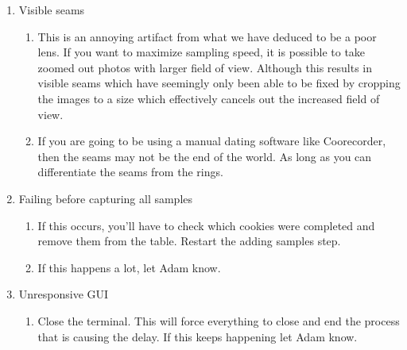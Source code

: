 \documentclass{article}
\begin{document}
\begin{outline}[enumerate]
\begin{enumerate}
\begin{enumerate}
        \end{enumerate}
    \item Visible seams
        \begin{enumerate}
        \item This is an annoying artifact from what we have deduced to be a poor lens. If you want to maximize sampling speed, it is possible to take zoomed out photos with larger field of view. Although this 
        results in visible seams which have seemingly only been able to be fixed by cropping the images to a size which effectively cancels out the increased field of view.
        \item If you are going to be using a manual dating software like Coorecorder, then the seams may not be the end of the world. As long as you can differentiate the seams from the rings.
        \end{enumerate}
    \item Failing before capturing all samples
        \begin{enumerate}
            \item If this occurs, you'll have to check which cookies were completed and remove them from the table. Restart the adding samples step. 
            \item If this happens a lot, let Adam know.
        \end{enumerate}
    \item Unresponsive GUI
        \begin{enumerate}
            \item Close the terminal. This will force everything to close and end the process that is causing the delay. If this keeps happening let Adam know.
        \end{enumerate}


\end{enumerate}
\end{outline}
\end{document}
